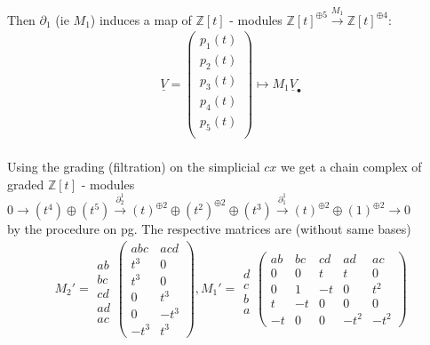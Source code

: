 \documentclass[11pt,a4paper]{report}
\begin{document}
              \\
              Then $\partial_1$ (ie $M_1$) induces a map of $\mathbb{Z}[t]$ - modules $\mathbb{Z}[t]^{\oplus5} \xrightarrow{M_1} \mathbb{Z}[t]^{\oplus4}$:
              \begin{align*}
                \underline{V} = \left(\begin{array}{c}p_1(t)\\p_2(t)\\p_3(t)\\p_4(t)\\p_5(t)\\\end{array}\right) \mapsto M_1 \underline{V}_\bullet
              \end{align*}
              \\
              Using the grading (filtration) on the simplicial $cx$ we get a chain complex of graded $\mathbb{Z}[t]$ - modules\\
              $0 \rightarrow (t^4)\oplus(t^5) \xrightarrow{\partial_2^1} (t)^{\oplus2}\oplus(t^2)^{\oplus2}\oplus(t^3) \xrightarrow{\partial_1^1} (t)^{\oplus2}\oplus(1)^{\oplus2} \rightarrow 0$\\
              by the procedure on pg. The respective matrices are (without same bases)
              \begin{align*}
                M_2' = \begin{array}{c}\\ab\\bc\\cd\\ad\\ac\end{array}\left(\begin{array}{cc}abc&acd\\t^3&0\\t^3&0\\0&t^3\\0&-t^3\\-t^3&t^3\end{array}\right), M_1' = \begin{array}{c}\\d\\c\\b\\a\end{array}\left(\begin{array}{ccccc}ab&bc&cd&ad&ac\\0&0&t&t&0\\0&1&-t&0&t^2\\t&-t&0&0&0\\-t&0&0&-t^2&-t^2\end{array}\right)
              \end{align*}
\end{document}
